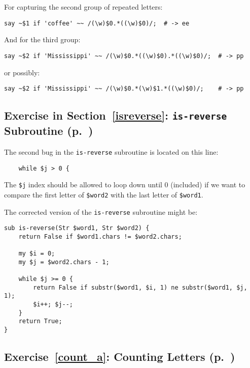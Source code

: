 For capturing the second group of repeated letters:

\begin{verbatim}
say ~$1 if 'coffee' ~~ /(\w)$0.*((\w)$0)/;  # -> ee
\end{verbatim}

And for the third group:

\begin{verbatim}
say ~$2 if 'Mississippi' ~~ /(\w)$0.*((\w)$0).*((\w)$0)/;  # -> pp
\end{verbatim}

or possibly:
\begin{verbatim}
say ~$2 if 'Mississippi' ~~ /(\w)$0.*(\w)$1.*((\w)$0)/;    # -> pp
\end{verbatim}


\subsection{Exercise in Section~\ref{isreverse}: {\tt is-reverse} Subroutine (p.~\pageref{isreverse})}
\label{sol_isreverse}

The second bug in the {\tt is-reverse} subroutine is located 
on this line:

\begin{verbatim}
    while $j > 0 {
\end{verbatim}
%

The {\tt \$j} index should be allowed to loop down until 0 
(included) if we want to compare the first letter of 
{\tt \$word2} with the last letter of {\tt \$word1}.

The corrected version of the  {\tt is-reverse} subroutine 
might be:

\begin{verbatim}
sub is-reverse(Str $word1, Str $word2) {
    return False if $word1.chars != $word2.chars;
    
    my $i = 0;
    my $j = $word2.chars - 1;

    while $j >= 0 {
        return False if substr($word1, $i, 1) ne substr($word1, $j, 1);
        $i++; $j--;
    }
    return True;
}
\end{verbatim}
%

\subsection{Exercise~\ref{count_a}: Counting Letters (p.~\pageref{count_a})}
\label{sol_count_a}

